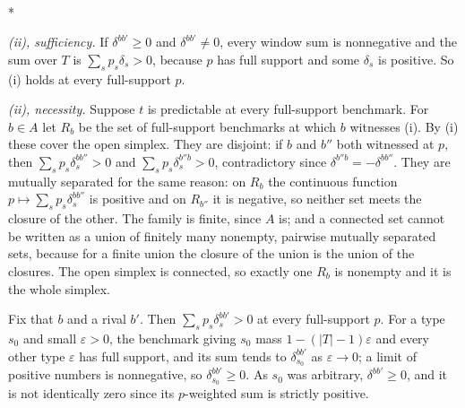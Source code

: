 \documentclass[12pt]{article}
\makeatletter
\theoremstyle{definition}
\renewenvironment{proof}[1][\proofname]{\par
  \pushQED{\qed}%
  \normalfont \topsep6\p@\@plus6\p@\relax
  \trivlist
  \item[\hskip\labelsep\itshape #1\@addpunct{.}]\mbox{}\\*
  \ignorespaces
}{%
  \popQED\endtrivlist\@endpefalse
}
\makeatother
\begin{document}
\begin{proof}[Proof of Theorem \ref{th:dominance}]
\emph{(ii), sufficiency.} If $\delta^{bb'} \ge 0$ and $\delta^{bb'} \neq 0$, every window sum is nonnegative and the sum over $T$ is $\sum_s p_s \delta_s > 0$, because $p$ has full support and some $\delta_s$ is positive. So (i) holds at every full-support $p$.

\emph{(ii), necessity.} Suppose $t$ is predictable at every full-support benchmark. For $b \in A$ let $R_b$ be the set of full-support benchmarks at which $b$ witnesses (i). By (i) these cover the open simplex. They are disjoint: if $b$ and $b''$ both witnessed at $p$, then $\sum_s p_s \delta^{bb''}_s > 0$ and $\sum_s p_s \delta^{b''b}_s > 0$, contradictory since $\delta^{b''b} = -\delta^{bb''}$. They are mutually separated for the same reason: on $R_b$ the continuous function $p \mapsto \sum_s p_s \delta^{bb''}_s$ is positive and on $R_{b''}$ it is negative, so neither set meets the closure of the other. The family is finite, since $A$ is; and a connected set cannot be written as a union of finitely many nonempty, pairwise mutually separated sets, because for a finite union the closure of the union is the union of the closures. The open simplex is connected, so exactly one $R_b$ is nonempty and it is the whole simplex.

Fix that $b$ and a rival $b'$. Then $\sum_s p_s \delta^{bb'}_s > 0$ at every full-support $p$. For a type $s_0$ and small $\varepsilon > 0$, the benchmark giving $s_0$ mass $1 - (|T|-1)\varepsilon$ and every other type $\varepsilon$ has full support, and its sum tends to $\delta^{bb'}_{s_0}$ as $\varepsilon \to 0$; a limit of positive numbers is nonnegative, so $\delta^{bb'}_{s_0} \ge 0$. As $s_0$ was arbitrary, $\delta^{bb'} \ge 0$, and it is not identically zero since its $p$-weighted sum is strictly positive.
\end{proof}
\end{document}
